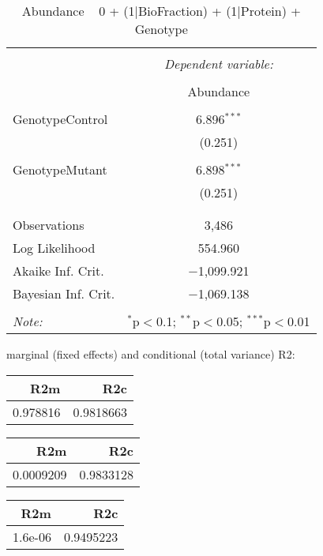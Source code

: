 \documentclass[11pt]{report}
\begin{document}
\begin{table}[!htbp] \centering 
  \caption{Abundance ~ 0 + (1|BioFraction) + (1|Protein) + Genotype} 
  \label{} 
\begin{tabular}{@{\extracolsep{5pt}}lc} 
\\[-1.8ex]\hline 
\hline \\[-1.8ex] 
 & \multicolumn{1}{c}{\textit{Dependent variable:}} \\ 
\cline{2-2} 
\\[-1.8ex] & Abundance \\ 
\hline \\[-1.8ex] 
 GenotypeControl & 6.896$^{***}$ \\ 
  & (0.251) \\ 
  & \\ 
 GenotypeMutant & 6.898$^{***}$ \\ 
  & (0.251) \\ 
  & \\ 
\hline \\[-1.8ex] 
Observations & 3,486 \\ 
Log Likelihood & 554.960 \\ 
Akaike Inf. Crit. & $-$1,099.921 \\ 
Bayesian Inf. Crit. & $-$1,069.138 \\ 
\hline 
\hline \\[-1.8ex] 
\textit{Note:}  & \multicolumn{1}{r}{$^{*}$p$<$0.1; $^{**}$p$<$0.05; $^{***}$p$<$0.01} \\ 
\end{tabular} 
\end{table} 
marginal (fixed effects) and conditional (total variance) R2:

\begin{tabular}{r|r}
\hline
R2m & R2c\\
\hline
0.978816 & 0.9818663\\
\hline
\end{tabular}

\begin{tabular}{r|r}
\hline
R2m & R2c\\
\hline
0.0009209 & 0.9833128\\
\hline
\end{tabular}

\begin{tabular}{r|r}
\hline
R2m & R2c\\
\hline
1.6e-06 & 0.9495223\\
\hline
\end{tabular}
\end{document}
